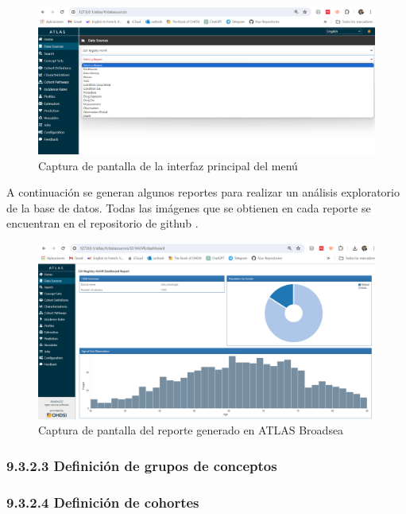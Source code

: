 \begin{figure}[H]
    \centering
    \includegraphics[width=1\textwidth]{figures/atlasDataSources.png}
    \caption{Captura de pantalla de la interfaz principal del menú }
    \label{figure:atlasDataSources}
\end{figure}

A continuación se generan algunos reportes para realizar un análisis exploratorio de la base de datos. Todas las imágenes que se obtienen en cada reporte se encuentran en el repositorio de github .

\begin{figure}[H]
    \centering
    \includegraphics[width=1\textwidth]{figures/atlasCAPdashboard.png}
    \caption{Captura de pantalla del reporte  generado en ATLAS Broadsea}
    \label{figure:atlasCAPdashboard}
\end{figure}

\subsubsection{9.3.2.3 Definición de grupos de conceptos}

\subsubsection{9.3.2.4 Definición de cohortes}

